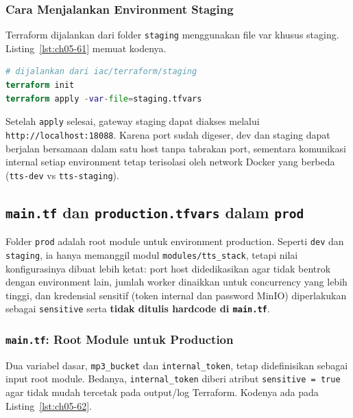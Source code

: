 \subsubsection{Cara Menjalankan Environment Staging}

Terraform dijalankan dari folder \texttt{staging} menggunakan file var khusus staging. Listing~\ref{lst:ch05-61} memuat kodenya.

\begin{lstlisting}[language=terraform, caption={Potongan kode Terraform pada Cara Menjalankan Environment Staging}, label={lst:ch05-61}]
# dijalankan dari iac/terraform/staging
terraform init
terraform apply -var-file=staging.tfvars
\end{lstlisting}

Setelah \texttt{apply} selesai, gateway staging dapat diakses melalui \texttt{http://localhost:18088}. Karena port sudah digeser, dev dan staging dapat berjalan bersamaan dalam satu host tanpa tabrakan port, sementara komunikasi internal setiap environment tetap terisolasi oleh network Docker yang berbeda (\texttt{tts-dev} vs \texttt{tts-staging}).


\subsection{\texttt{main.tf} dan \texttt{production.tfvars} dalam \texttt{prod}}

Folder \texttt{prod} adalah root module untuk environment production. Seperti \texttt{dev} dan \texttt{staging}, ia hanya memanggil modul \texttt{modules/tts\_stack}, tetapi nilai konfigurasinya dibuat lebih ketat: port host didedikasikan agar tidak bentrok dengan environment lain, jumlah worker dinaikkan untuk concurrency yang lebih tinggi, dan kredensial sensitif (token internal dan password MinIO) diperlakukan sebagai \texttt{sensitive} serta \textbf{tidak ditulis hardcode di \texttt{main.tf}}.

\subsubsection{\texttt{main.tf}: Root Module untuk Production}

Dua variabel dasar, \texttt{mp3\_bucket} dan \texttt{internal\_token}, tetap didefinisikan sebagai input root module. Bedanya, \texttt{internal\_token} diberi atribut \texttt{sensitive = true} agar tidak mudah tercetak pada output/log Terraform. Kodenya ada pada Listing~\ref{lst:ch05-62}.

